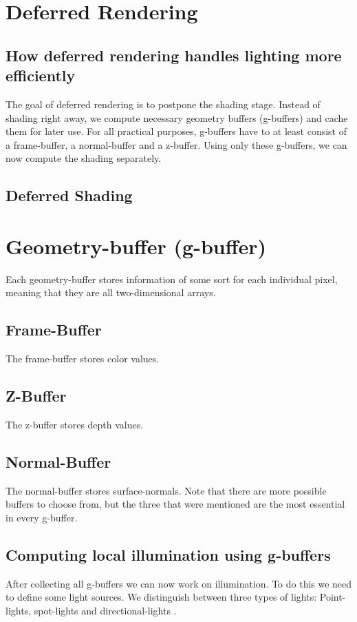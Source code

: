 \documentclass{ACGSeminar}
\begin{document}
\section{Deferred Rendering}
	\subsection{How deferred rendering handles lighting more efficiently}
		The goal of deferred rendering is to postpone the shading stage. %
		Instead of shading right away, we compute necessary geometry buffers (g-buffers) and cache 
		them for later use. For all practical purposes, g-buffers have to at least consist of a frame-buffer, a normal-buffer and a z-buffer. Using only these g-buffers, 
		we can now compute the shading separately.
	\subsection{Deferred Shading}

\section{Geometry-buffer (g-buffer)}
	Each geometry-buffer stores information of some sort for each individual pixel, meaning that they are all two-dimensional arrays.
	\subsection{Frame-Buffer}
		The frame-buffer stores color values. 
	\subsection{Z-Buffer}
		The z-buffer stores depth values.
	\subsection{Normal-Buffer}
		The normal-buffer stores surface-normals.
		Note that there are more possible buffers to choose from, but the three that were mentioned are the most essential in every g-buffer.
	\subsection{Computing local illumination using g-buffers}
		After collecting all g-buffers we can now work on illumination. To do this we need to define some light sources. We distinguish between three types of lights:
		Point-lights, spot-lights and directional-lights \cite{DST}.
\end{document}
